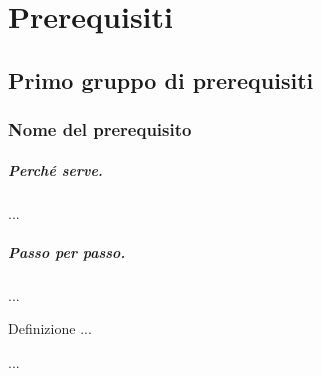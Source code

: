 \setcounter{chapter}{-1}
\chapter{Prerequisiti}\label{cap:prerequisiti}


\section{Primo gruppo di prerequisiti}\label{p:gruppo1}

\subsection{Nome del prerequisito}\label{p:esempio}
\paragraph{Perché serve.} ...
\paragraph{Passo per passo.} ...
\begin{riquadro}{Definizione}
...
\end{riquadro}
\begin{esempio}[titolo]
...
\end{esempio}
